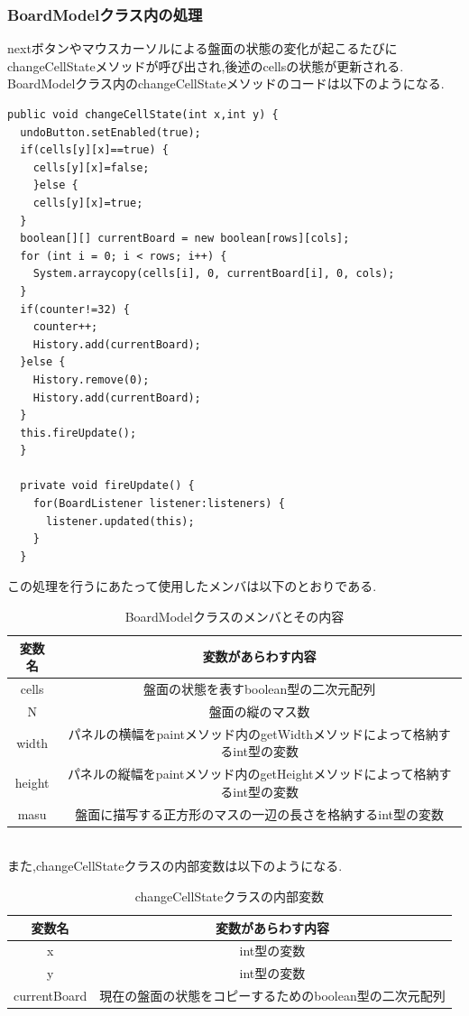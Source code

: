 \documentclass[dvipdfmx]{jarticle}
\begin{document}
\subsubsection{BoardModelクラス内の処理}
nextボタンやマウスカーソルによる盤面の状態の変化が起こるたびにchangeCellStateメソッドが呼び出され,後述のcellsの状態が更新される.
BoardModelクラス内のchangeCellStateメソッドのコードは以下のようになる.
\begin{lstlisting}[caption=BoardModelクラス内の該当部のコード,label=fuga]
public void changeCellState(int x,int y) {
  undoButton.setEnabled(true);
  if(cells[y][x]==true) {
    cells[y][x]=false;
	}else {
    cells[y][x]=true;
  }
  boolean[][] currentBoard = new boolean[rows][cols];
  for (int i = 0; i < rows; i++) {
    System.arraycopy(cells[i], 0, currentBoard[i], 0, cols);
  }
  if(counter!=32) {
    counter++;
    History.add(currentBoard);
  }else {
    History.remove(0);
    History.add(currentBoard);
  }
  this.fireUpdate();
  }

  private void fireUpdate() {
    for(BoardListener listener:listeners) {
      listener.updated(this);
    }
  }
\end{lstlisting}
この処理を行うにあたって使用したメンバは以下のとおりである.
\begin{table}[h]
  \centering
  \begin{tabular}{|c||c|}
    \hline
    変数名 & 変数があらわす内容\\
    \hline\hline
    cells & 盤面の状態を表すboolean型の二次元配列\\\hline
    N & 盤面の縦のマス数\\\hline
    width & パネルの横幅をpaintメソッド内のgetWidthメソッドによって格納するint型の変数 \\\hline
    height & パネルの縦幅をpaintメソッド内のgetHeightメソッドによって格納するint型の変数\\\hline
    masu & 盤面に描写する正方形のマスの一辺の長さを格納するint型の変数\\\hline

  \end{tabular}
  \caption{BoardModelクラスのメンバとその内容}
\end{table}
\\また,changeCellStateクラスの内部変数は以下のようになる.
\begin{table}[h]
  \centering
  \begin{tabular}{|c|c|}\hline
    変数名 & 変数があらわす内容\\\hline\hline
    x & int型の変数\\\hline    
    y & int型の変数\\\hline
    currentBoard & 現在の盤面の状態をコピーするためのboolean型の二次元配列\\\hline
  \end{tabular}
  \caption{changeCellStateクラスの内部変数}
\end{table}
\end{document}
